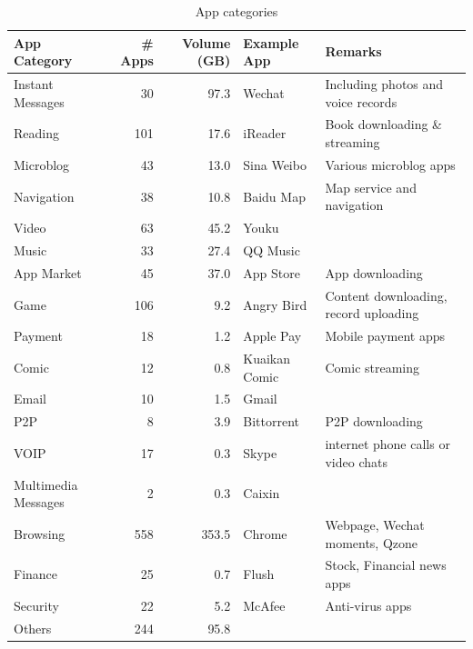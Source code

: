 \begin{table}[h]
	\centering
	\begin{tabular}{lrrll}\hline
	App Category & \# Apps & Volume (GB) & Example App & Remarks \\
    \hline
	Instant Messages & 30 & 97.3 & Wechat & Including photos and voice records \\
	Reading & 101 & 17.6 & iReader & Book downloading \& streaming \\
	Microblog & 43 & 13.0 & Sina Weibo & Various microblog apps \\
	Navigation  & 38 & 10.8 & Baidu Map & Map service and navigation \\
	Video  & 63 & 45.2 & Youku & \\
	Music  & 33 & 27.4 & QQ Music & \\
	App Market & 45 & 37.0 & App Store & App downloading \\
	Game  & 106 & 9.2 & Angry Bird & Content downloading, record uploading \\
	Payment & 18 & 1.2 & Apple Pay & Mobile payment apps \\
	Comic & 12 & 0.8 & Kuaikan Comic & Comic streaming \\
	Email & 10 & 1.5 & Gmail & \\
	P2P & 8 & 3.9 & Bittorrent & P2P downloading \\
	VOIP  & 17 & 0.3 & Skype & internet phone calls or video chats \\
	Multimedia Messages & 2 & 0.3 & Caixin & \\
	Browsing & 558 & 353.5 & Chrome & Webpage, Wechat moments, Qzone \\
	Finance  & 25 & 0.7 & Flush & Stock, Financial news apps \\
	Security  & 22 & 5.2 & McAfee & Anti-virus apps\\
    Others  & 244 & 95.8 & & \\
    \hline
	\end{tabular}
	\caption{App categories}
	\label{table:appcat}
\end{table}

